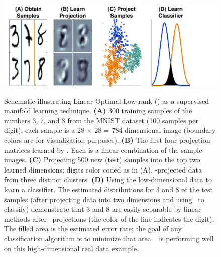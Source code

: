 \documentclass[11pt]{extarticle}
\begin{document}
\begin{figure}
\centering %
\includegraphics[height=2in]{mnist2.pdf} %
\caption{Schematic illustrating Linear Optimal Low-rank (\Lol)  as a supervised manifold learning technique.
\textbf{(A)} 300 training samples of the numbers 3, 7, and 8 from the MNIST dataset (100 samples per digit);  each sample is a 28 $\times$ 28 = 784 dimensional image (boundary colors are  for visualization purposes).
\textbf{(B)} The first four projection matrices learned by \Lol.  Each is a linear combination of the sample images.
\textbf{(C)} Projecting 500 new (test) samples into the top two learned dimensions;
 digits color coded as in (A). \Lol-projected data from three distinct clusters.
\textbf{(D)}  Using the low-dimensional data to learn a classifier.  The estimated  distributions for 3 and 8 of the test samples (after
projecting data into two dimensions and using \Lda~to classify) demonstrate that 3 and 8 are easily separable by linear methods after \Lol~projections (the color of the line indicates the digit).
The filled area is the estimated error rate; the goal of any classification algorithm is to minimize that area. \Lol~is performing well on this high-dimensional real data example.
}
\label{f:mnist}
\end{figure}
\end{document}
